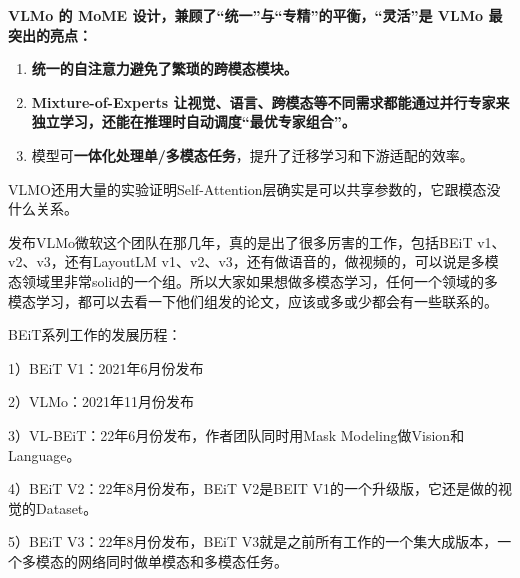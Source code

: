 \documentclass[zihao=false,fontset=windows]{ctexart}
\newcommand{\redb}[1]{\textcolor{feishuRed}{\textbf{#1}}}
\begin{document}
\par\vspace{1.15em}\par\vspace{0.28em}
\textbf{VLMo 的 MoME 设计，兼顾了“统一”与“专精”的平衡，“}\redb{灵活}\textbf{”是 VLMo 最突出的亮点：}\par
\begin{enumerate}
\item \textbf{统一的自注意力避免了繁琐的跨模态模块。}
\item \textbf{Mixture-of-Experts 让视觉、语言、跨模态等不同需求都能通过}\textbf{并行专家来独立学习，还能在推理时自动调度“最优专家组合”。}
\item 模型可\textbf{一体化处理单/多模态任务}，提升了迁移学习和下游适配的效率。
\end{enumerate}
VLMO还用大量的实验证明Self-Attention层确实是可以共享参数的，它跟模态没什么关系。\par
发布VLMo微软这个团队在那几年，真的是出了很多厉害的工作，包括BEiT v1、v2、v3，还有LayoutLM v1、v2、v3，还有做语音的，做视频的，可以说是多模态领域里非常solid的一个组。所以大家如果想做多模态学习，任何一个领域的多模态学习，都可以去看一下他们组发的论文，应该或多或少都会有一些联系的。\par
BEiT系列工作的发展历程：\par
1）BEiT V1：2021年6月份发布\par
2）VLMo：2021年11月份发布\par
3）VL-BEiT：22年6月份发布，作者团队同时用Mask Modeling做Vision和 Language。\par
4）BEiT V2：22年8月份发布，BEiT V2是BEIT V1的一个升级版，它还是做的视觉的Dataset。\par
5）BEiT V3：22年8月份发布，BEiT V3就是之前所有工作的一个集大成版本，一个多模态的网络同时做单模态和多模态任务。\par
\end{document}
